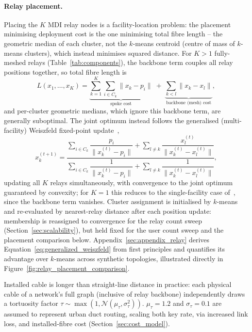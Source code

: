 \documentclass[12pt]{article}
\begin{document}
\paragraph{Relay placement.}
\label{sec:relay_placement}
Placing the $K$ MDI relay nodes is a facility-location problem: the placement minimising deployment cost is the one minimising total fibre length -- the geometric median of each cluster, not the $k$-means centroid (centre of mass of $k$-means clusters), which instead minimises squared distance. For $K>1$ fully-meshed relays (Table~\ref{tab:components}), the backbone term couples all relay positions together, so total fibre length is
\begin{equation}
    L(x_1,\dots,x_K) = \underbrace{\sum_{k=1}^{K}\sum_{i \in C_k} \|x_k - p_i\|}_{\text{spoke cost}} \;+\; \underbrace{\sum_{k<l} \|x_k - x_l\|}_{\text{backbone (mesh) cost}},
    \label{eq:hub_objective}
\end{equation}
and per-cluster geometric medians, which ignore this backbone term, are generally suboptimal. The joint optimum instead follows the generalised (multi-facility) Weiszfeld fixed-point update~\cite{Kuhn_1973},
\begin{equation}
    x_k^{(t+1)} = \frac{\displaystyle\sum_{i \in C_k} \dfrac{p_i}{\|x_k^{(t)} - p_i\|} + \sum_{l \neq k} \dfrac{x_l^{(t)}}{\|x_k^{(t)} - x_l^{(t)}\|}}{\displaystyle\sum_{i \in C_k} \dfrac{1}{\|x_k^{(t)} - p_i\|} + \sum_{l \neq k} \dfrac{1}{\|x_k^{(t)} - x_l^{(t)}\|}},
    \label{eq:generalized_weiszfeld}
\end{equation}
updating all $K$ relays simultaneously, with convergence to the joint optimum guaranteed by convexity; for $K=1$ this reduces to the single-facility case of~\cite{Kuhn_1973}, since the backbone term vanishes. Cluster assignment is initialised by $k$-means and re-evaluated by nearest-relay distance after each position update: membership is reassigned to convergence for the relay count sweep (Section~\ref{sec:scalability}), but held fixed for the user count sweep and the placement comparison below. Appendix~\ref{sec:appendix_relay} derives Equation~\ref{eq:generalized_weiszfeld} from first principles and quantifies its advantage over $k$-means across synthetic topologies, illustrated directly in Figure~\ref{fig:relay_placement_comparison}.

Installed cable is longer than straight-line distance in practice: each physical cable of a network's full graph (inclusive of relay backbone) independently draws a tortuosity factor $\tau \sim \max(1, \mathcal{N}(\mu_\tau, \sigma_\tau^2))$. $\mu_\tau = 1.2$ and $\sigma_\tau = 0.1$ are assumed to represent urban duct routing, scaling both key rate, via increased link loss, and installed-fibre cost (Section~\ref{sec:cost_model}).
\end{document}
